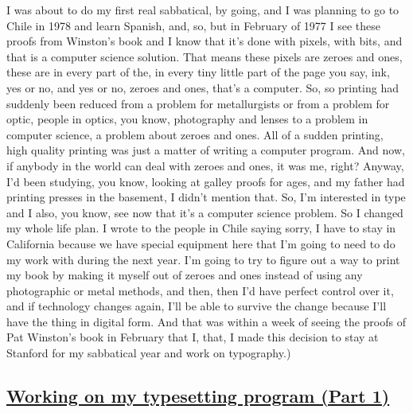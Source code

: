 \documentclass[]{article}
\begin{document}
I was about to do my first real sabbatical, by going, and I was planning
to go to Chile in 1978 and learn Spanish, and, so, but in February of
1977 I see these proofs from Winston's book and I know that it's done
with pixels, with bits, and that is a computer science solution. That
means these pixels are zeroes and ones, these are in every part of the,
in every tiny little part of the page you say, ink, yes or no, and yes
or no, zeroes and ones, that's a computer. So, so printing had suddenly
been reduced from a problem for metallurgists or from a problem for
optic, people in optics, you know, photography and lenses to a problem
in computer science, a problem about zeroes and ones. All of a sudden
printing, high quality printing was just a matter of writing a computer
program. And now, if anybody in the world can deal with zeroes and ones,
it was me, right? Anyway, I'd been studying, you know, looking at galley
proofs for ages, and my father had printing presses in the basement, I
didn't mention that. So, I'm interested in type and I also, you know,
see now that it's a computer science problem. So I changed my whole life
plan. I wrote to the people in Chile saying sorry, I have to stay in
California because we have special equipment here that I'm going to need
to do my work with during the next year. I'm going to try to figure out
a way to print my book by making it myself out of zeroes and ones
instead of using any photographic or metal methods, and then, then I'd
have perfect control over it, and if technology changes again, I'll be
able to survive the change because I'll have the thing in digital form.
And that was within a week of seeing the proofs of Pat Winston's book in
February that I, that, I made this decision to stay at Stanford for my
sabbatical year and work on typography.)

\subsection{\texorpdfstring{\href{http://webofstories.com/play/17111}{Working
on my typesetting program (Part
1)}}{Working on my typesetting program (Part 1)}}\label{working-on-my-typesetting-program-part-1}
\end{document}
